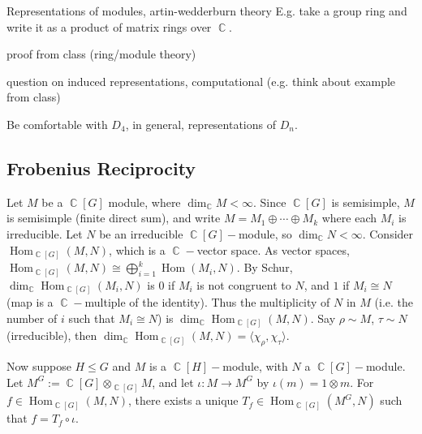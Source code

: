 \documentclass[11pt, a4paper]{memoir}
\DeclareMathOperator{\C}{{\mathbb{C}}}
\theoremstyle{change}
\theoremstyle{plain}
\theoremstyle{nonumberplain}
\DeclareMathOperator{\Hom}{Hom}
\numberwithin{equation}{section}
\begin{document}
Representations of modules, artin-wedderburn theory
E.g. take a group ring and write it as a product of matrix rings over $\C$.

proof from class (ring/module theory)

question on induced representations, computational (e.g. think about example from class)

Be comfortable with $D_4$, in general, representations of $D_n$.
\subsection{Frobenius Reciprocity}
Let $M$ be a $\C[G]$ module, where $\dim_{\C}M<\infty$.
Since $\C[G]$ is semisimple, $M$ is semisimple (finite direct sum), and write $M=M_1\oplus\cdots\oplus M_k$ where each $M_i$ is irreducible.
Let $N$ be an irreducible $\C[G]-$module, so $\dim_{\C}N<\infty$.
Consider $\Hom_{\C[G]}(M,N)$, which is a $\C-$vector space.
As vector spaces, $\Hom_{\C[G]}(M,N)\cong\bigoplus_{i=1}^k\Hom(M_i,N)$.
By Schur, $\dim_{\C}\Hom_{\C[G]}(M_i,N)$ is $0$ if $M_i$ is not congruent to $N$, and $1$ if $M_i\cong N$ (map is a $\C-$multiple of the identity).
Thus the multiplicity of $N$ in $M$ (i.e. the number of $i$ such that $M_i\cong N$) is $\dim_{\C}\Hom_{\C[G]}(M,N)$.
Say $\rho\sim M$, $\tau\sim N$ (irreducible), then $\dim_{\C}\Hom_{\C[G]}(M,N)=\langle\chi_\rho,\chi_\tau\rangle$.

Now suppose $H\leq G$ and $M$ is a $\C[H]-$module, with $N$ a $\C[G]-$module.
Let $M^G:=\C[G]\otimes_{\C[G]}M$, and let $\iota:M\to M^G$ by $\iota(m)=1\otimes m$.
For $f\in\Hom_{\C[G]}(M,N)$, there exists a unique $T_f\in\Hom_{\C[G]}(M^G,N)$ such that $f=T_f\circ\iota$.
\end{document}
